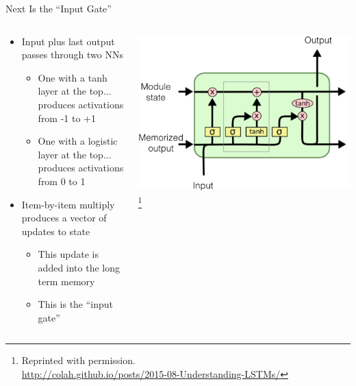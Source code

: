 \documentclass[aspectratio=169]{beamer}
\begin{document}
\begin{frame}{Next Is the ``Input Gate''}

\begin{columns}
\begin{column}{0.5\textwidth}
\begin{itemize}
	\item Input plus last output passes through two NNs
	\begin{itemize}
		\item One with a tanh layer at the top...
		produces activations from -1 to +1
		\item One with a logistic layer at the top...
		produces activations from 0 to 1
	\end{itemize}
	\item Item-by-item multiply produces a vector of updates to state
	\begin{itemize}
		\item This update is added into the long term memory
		\item This is the ``input gate''
	\end{itemize}
\end{itemize}
\end{column}
\begin{column}{0.5\textwidth}
\includegraphics[width=1\textwidth]{lectLSTM/adding.png}
\footnote{Reprinted with permission.\\ \hspace{1.7em}\url{http://colah.github.io/posts/2015-08-Understanding-LSTMs/}}
\end{column}
\end{columns}
\end{frame}
\end{document}
